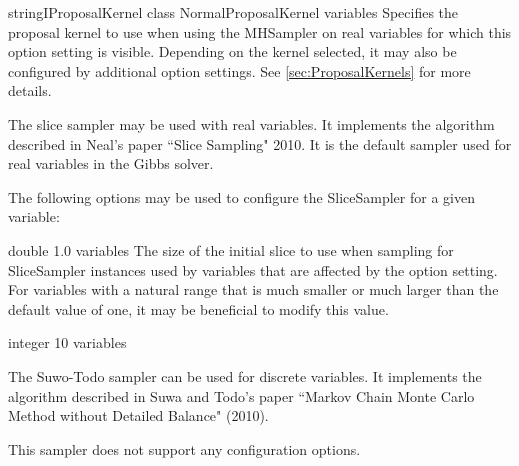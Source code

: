 
{\ifmatlab string\fi \ifjava IProposalKernel class\fi}
{NormalProposalKernel}
{variables}
{Specifies the proposal kernel to use when using the MHSampler on real variables for which this option setting is visible. Depending on the kernel selected, it may also be configured by additional option settings. See \autoref{sec:ProposalKernels} for more details.}

\label{sec:SliceSampler}

The slice sampler may be used with real variables. It implements the algorithm described in Neal's paper ``Slice Sampling" 2010. It is the default sampler used for real variables in the Gibbs solver.

The following options may be used to configure the SliceSampler for a given variable:


{double}
{1.0}
{variables}
{The size of the initial slice to use when sampling for SliceSampler instances used by variables that are affected by the option setting. For variables with a natural range that is much smaller or much larger than the default value of one, it may be beneficial to modify this value.}


{integer}
{10}
{variables}
{}

\label{sec:SuwoTodoSampler}

The Suwo-Todo sampler can be used for discrete variables. It implements the algorithm described in Suwa and Todo's paper ``Markov Chain Monte Carlo Method without Detailed Balance" (2010).

This sampler does not support any configuration options.
